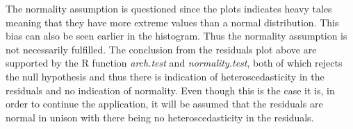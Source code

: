 \noindent The normality assumption is questioned since the plots indicates heavy tales meaning that they have more extreme values than a normal distribution. This bias can also be seen earlier in the histogram. Thus the normality assumption is not necessarily fulfilled. The conclusion from the residuals plot above are supported by the R function \textit{arch.test} and \textit{normality.test}, both of which rejects the null hypothesis  and thus there is indication of heteroscedasticity in the residuals and no indication of normality. Even though this is the case it is, in order to continue the application, it will be assumed that the residuals are normal in unison with there being no heteroscedasticity in the residuals.